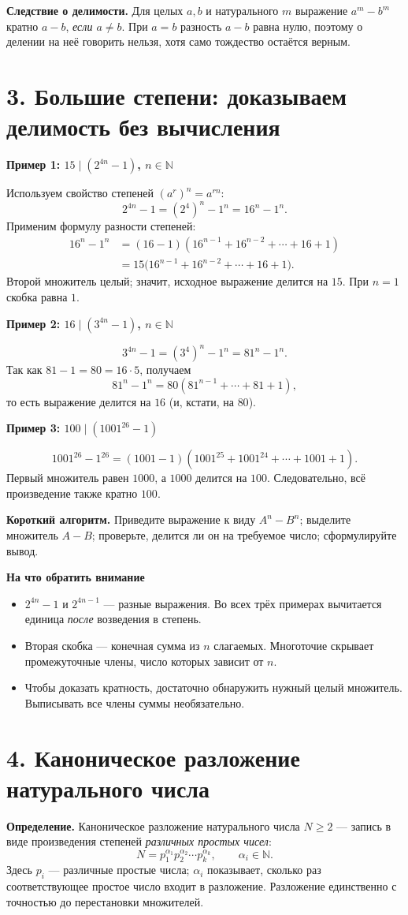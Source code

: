 \documentclass[a4paper,12pt]{article}
\newcommand{\important}[1]{\textcolor{deepaccent}{\textbf{#1}}}
\newcommand{\method}[1]{\medskip\noindent\textcolor{deepaccent}{\textbf{#1}}\quad}
\newcommand{\sectiontitle}[1]{\needspace{5\baselineskip}\section*{\color{deepaccent}#1}}
\newcommand{\subtopic}[1]{\medskip\textbf{\color{accent}#1}\par\vspace{-2pt}}
\begin{document}
\important{Следствие о делимости.} Для целых $a,b$ и натурального $m$ выражение $a^m-b^m$ кратно $a-b$, \emph{если $a\ne b$}. При $a=b$ разность $a-b$ равна нулю, поэтому о делении на неё говорить нельзя, хотя само тождество остаётся верным.
\clearpage

\sectiontitle{3. Большие степени: доказываем делимость без вычисления}
\subtopic{Пример 1: $15\mid(2^{4n}-1)$, $n\in\mathbb N$}
Используем свойство степеней $(a^r)^n=a^{rn}$:
\[
2^{4n}-1=(2^4)^n-1^n=16^n-1^n.
\]
Применим формулу разности степеней:
\begin{align*}
16^n-1^n &= (16-1)(16^{n-1}+16^{n-2}+\cdots+16+1)\\
 &= 15\bigl(16^{n-1}+16^{n-2}+\cdots+16+1\bigr).
\end{align*}
Второй множитель целый; значит, исходное выражение делится на $15$. При $n=1$ скобка равна $1$.

\subtopic{Пример 2: $16\mid(3^{4n}-1)$, $n\in\mathbb N$}
\[
3^{4n}-1=(3^4)^n-1^n=81^n-1^n.
\]
Так как $81-1=80=16\cdot5$, получаем
\[
81^n-1^n=80(81^{n-1}+\cdots+81+1),
\]
то есть выражение делится на $16$ (и, кстати, на $80$).

\subtopic{Пример 3: $100\mid(1001^{26}-1)$}
\[
1001^{26}-1^{26}=(1001-1)(1001^{25}+1001^{24}+\cdots+1001+1).
\]
Первый множитель равен $1000$, а $1000$ делится на $100$. Следовательно, всё произведение также кратно $100$.

\method{Короткий алгоритм.} Приведите выражение к виду $A^n-B^n$; выделите множитель $A-B$; проверьте, делится ли он на требуемое число; сформулируйте вывод.

\subtopic{На что обратить внимание}
\begin{itemize}
\item $2^{4n}-1$ и $2^{4n-1}$ --- разные выражения. Во всех трёх примерах вычитается единица \emph{после} возведения в степень.
\item Вторая скобка --- конечная сумма из $n$ слагаемых. Многоточие скрывает промежуточные члены, число которых зависит от $n$.
\item Чтобы доказать кратность, достаточно обнаружить нужный целый множитель. Выписывать все члены суммы необязательно.
\end{itemize}

\sectiontitle{4. Каноническое разложение натурального числа}
\important{Определение.} Каноническое разложение натурального числа $N\ge2$ --- запись в виде произведения степеней \emph{различных простых чисел}:
\[
\boxed{N=p_1^{\alpha_1}p_2^{\alpha_2}\cdots p_k^{\alpha_k},\qquad\alpha_i\in\mathbb N.}
\]
Здесь $p_i$ --- различные простые числа; $\alpha_i$ показывает, сколько раз соответствующее простое число входит в разложение. Разложение единственно с точностью до перестановки множителей.
\end{document}
